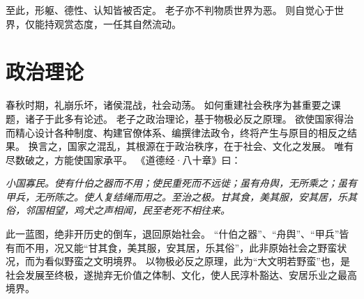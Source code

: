 \documentclass[11pt]{article}
\begin{document}
至此，形躯、德性、认知皆被否定。
老子亦不判物质世界为恶。
则自觉心于世界，仅能持观赏态度，一任其自然流动。
  
\section{政治理论}
春秋时期，礼崩乐坏，诸侯混战，社会动荡。
如何重建社会秩序为甚重要之课题，诸子于此多有论述。
老子之政治理论，基于物极必反之原理。
欲使国家得治而精心设计各种制度、构建官僚体系、编撰律法政令，终将产生与原目的相反之结果。
换言之，国家之混乱，其根源在于政治秩序，在于社会、文化之发展。
唯有尽数破之，方能使国家承平。
《道德经·八十章》曰：

\textit{小国寡民。使有什伯之器而不用；使民重死而不远徙；虽有舟舆，无所乘之；虽有甲兵，无所陈之。使人复结绳而用之。至治之极。甘其食，美其服，安其居，乐其俗，邻国相望，鸡犬之声相闻，民至老死不相往来。}

此一蓝图，绝非开历史的倒车，退回原始社会。
“什伯之器”、“舟舆”、“甲兵”皆有而不用，况又能“甘其食，美其服，安其居，乐其俗”，此非原始社会之野蛮状况，而为看似野蛮之文明境界。
以物极必反之原理，此为“大文明若野蛮”也，是社会发展至终极，遂抛弃无价值之体制、文化，使人民淳朴豁达、安居乐业之最高境界。
\end{document}
